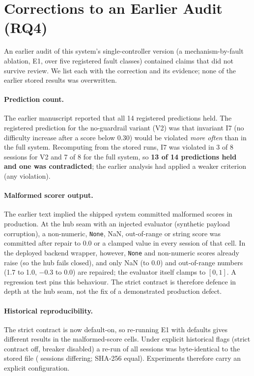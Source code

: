 \section{Corrections to an Earlier Audit (RQ4)}\label{sec:carry}
An earlier audit of this system's single-controller version (a mechanism-by-fault ablation, E1, over five registered fault classes) contained claims that did not survive review. We list each with the correction and its evidence; none of the earlier stored results was overwritten.
\paragraph{Prediction count.} The earlier manuscript reported that all 14 registered predictions held. The registered prediction for the no-guardrail variant (V2) was that invariant I7 (no difficulty increase after a score below 0.30) would be violated \emph{more often} than in the full system. Recomputing from the stored runs, I7 was violated in 3 of 8 sessions for V2 and 7 of 8 for the full system, so \textbf{13 of 14 predictions held and one was contradicted}; the earlier analysis had applied a weaker criterion (any violation).
\paragraph{Malformed scorer output.} The earlier text implied the shipped system committed malformed scores in production. At the hub seam with an injected evaluator (synthetic payload corruption), a non-numeric, \texttt{None}, NaN, out-of-range or string score was committed after repair to 0.0 or a clamped value in every session of that cell. In the deployed backend wrapper, however, \texttt{None} and non-numeric scores already raise (so the hub fails closed), and only NaN (to 0.0) and out-of-range numbers (1.7 to 1.0, $-0.3$ to 0.0) are repaired; the evaluator itself clamps to $[0,1]$. A regression test pins this behaviour. The strict contract is therefore defence in depth at the hub seam, not the fix of a demonstrated production defect.
\paragraph{Historical reproducibility.} The strict contract is now default-on, so re-running E1 with defaults gives different results in the malformed-score cells. Under explicit historical flags (strict contract off, breaker disabled) a re-run of all \xeEoneRows{} sessions was byte-identical to the stored file (\xeEoneDiff{} sessions differing; SHA-256 equal). Experiments therefore carry an explicit configuration.
